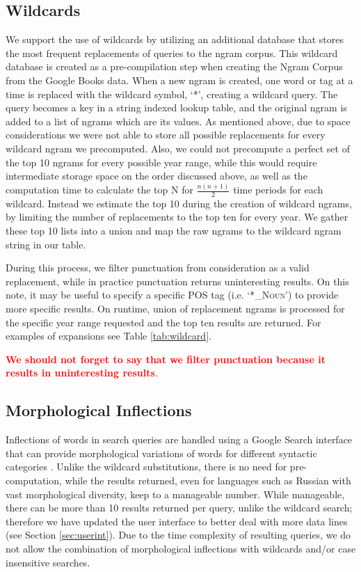 \documentclass[11pt]{article}
\begin{document}
\subsection{Wildcards}
\label{sec:wildcards}
	We support the use of wildcards by utilizing an additional database that stores the most frequent replacements of queries to the ngram corpus. This wildcard database is created as a pre-compilation step when creating the Ngram Corpus from the Google Books data. When a new ngram is created, one word or tag at a time is replaced with the wildcard symbol, `*', creating a wildcard query. The query becomes a key in a string indexed lookup table, and the original ngram is added to a list of ngrams which are its values. As mentioned above, due to space considerations we were not able to store all possible replacements for every wildcard ngram we precomputed. Also, we could not precompute a perfect set of the top 10 ngrams for every possible year range, while this would require intermediate storage space on the order discussed above, as well as the computation time to calculate the top N for $\frac{n(n+1)}{2}$ time periods for each wildcard. Instead we estimate the top 10 during the creation of wildcard ngrams, by limiting the number of replacements to the top ten for every year. We gather these top 10 lists into a union and map the raw ngrams to the wildcard ngram string in our table. 
	
	During this process, we filter punctuation from consideration as a valid replacement, while in practice punctuation returns uninteresting results. On this note, it may be useful to specify a specific \textsf{\textsc{POS}} tag (i.e. `*\textsf{\textsc{\_Noun}}') to provide more specific results. On runtime, union of replacement ngrams is processed for the specific year range requested and the top ten results are returned. For examples of expansions see Table \ref{tab:wildcard}. 

\textcolor{red}{\bf We should not forget to say that we filter punctuation because it results in uninteresting results}.

\subsection{Morphological Inflections}
Inflections of words in search queries are handled using a Google Search interface that can provide morphological variations of words for different syntactic categories \cite{durrett2013supervised}. Unlike the wildcard substitutions, there is no need for pre-computation, while the results returned, even for languages such as Russian with vast morphological diversity, keep to a manageable number. While manageable, there can be more than 10 results returned per query, unlike the wildcard search; therefore we have updated the user interface to better deal with more data lines (see Section \ref{sec:userint}). Due to the time complexity of resulting queries, we do not allow the combination of morphological inflections with wildcards and/or case insensitive searches.
\end{document}
